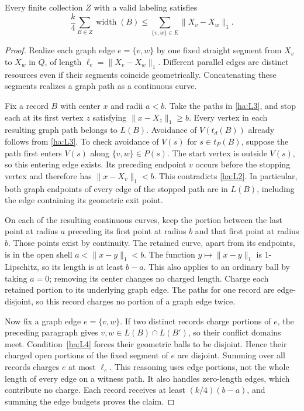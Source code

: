 \begin{lemma}\label{ha:labeled-energy}
Every finite collection $Z$ with a valid labeling satisfies
\[
       \frac{k}{4}\sum_{B\in Z}\operatorname{width}(B)
       \le \sum_{\{v,w\}\in E}\|X_v-X_w\|_1.
\]
\end{lemma}
\begin{proof}
Realize each graph edge $e=\{v,w\}$ by one fixed straight segment
from $X_v$ to $X_w$ in $Q$, of length $\ell_e=\|X_v-X_w\|_1$.
Different parallel edges are distinct resources even if their
segments coincide geometrically.  Concatenating these segments
realizes a graph path as a continuous curve.

Fix a record $B$ with center $x$ and radii $a<b$.  Take the paths in
\ref{ha:L3}, and stop each at its first vertex $z$ satisfying
$\|x-X_z\|_1\ge b$.  Every vertex in each resulting graph path
belongs to $L(B)$.  Avoidance of $V(t_d(B))$ already follows from
\ref{ha:L3}.  To check avoidance of $V(s)$ for $s\in t_P(B)$,
suppose the path first enters $V(s)$ along $\{v,w\}\in P(s)$.
The start vertex is outside $V(s)$, so this entering edge exists.
Its preceding endpoint $v$ occurs before the stopping vertex and
therefore has $\|x-X_v\|_1<b$.  This contradicts \ref{ha:L2}.
In particular, both graph endpoints of every edge of the stopped
path are in $L(B)$, including the edge containing its geometric
exit point.

On each of the resulting continuous curves, keep the portion between
the last point at radius $a$ preceding its first point at radius $b$
and that first point at radius $b$.  Those points exist by continuity.
The retained curve, apart from its endpoints, is in the open shell
$a<\|x-y\|_1<b$.  The function $y\mapsto\|x-y\|_1$ is
$1$-Lipschitz, so its length is at least $b-a$.  This also applies to
an ordinary ball by taking $a=0$; removing its center changes no
charged length.  Charge each retained portion to its underlying
graph edge.  The paths for one record are edge-disjoint, so this
record charges no portion of a graph edge twice.

Now fix a graph edge $e=\{v,w\}$.  If two distinct records charge
portions of $e$, the preceding paragraph gives
$v,w\in L(B)\cap L(B')$, so their conflict domains meet.
Condition~\ref{ha:L4} forces their geometric balls to be disjoint.
Hence their charged open portions of the fixed segment of $e$ are
disjoint.  Summing over all records charges $e$ at most $\ell_e$.
This reasoning uses edge portions, not the whole length of every
edge on a witness path.  It also handles zero-length edges, which
contribute no charge.  Each record receives at least
$(k/4)(b-a)$, and summing the edge budgets proves the claim.
\end{proof}

